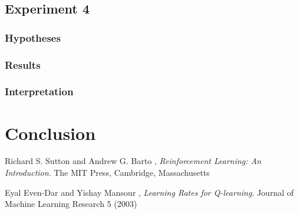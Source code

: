 \documentclass[11pt]{article}
\begin{document}
\subsubsection{}

\subsection{Experiment 4}

\subsubsection{Hypotheses}


\subsubsection{Results}


\subsubsection{Interpretation}


\subsubsection{}

\section{Conclusion}

\begin{thebibliography}{9}

  Richard S. Sutton and Andrew G. Barto ,
  \emph{Reinforcement Learning: An Introduction}.
  The MIT Press, Cambridge, Massachusetts

  Eyal Even-Dar and Yishay Mansour ,
  \emph{Learning Rates for Q-learning}.
  Journal of Machine Learning Research 5 (2003)

\end{thebibliography}
\end{document}
